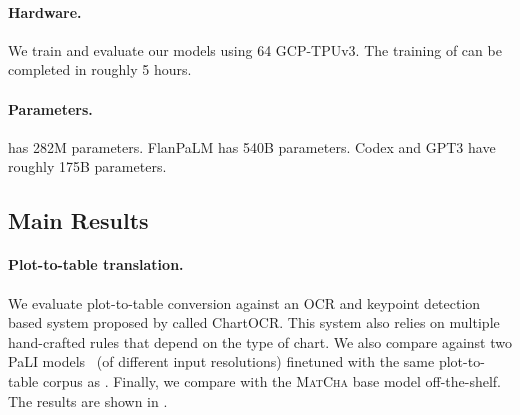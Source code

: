 \begin{table}[ht]
\centering
\caption{Data statistics for the training data of plot-to-table task.}
\label{tab:deplot_stats}
\end{table}


\paragraph{Hardware.} We train and evaluate our models using 64 GCP-TPUv3. The training of \model{} can be completed in roughly 5 hours.

\paragraph{Parameters.} \model{} has 282M parameters. FlanPaLM has 540B parameters. Codex and GPT3 have roughly 175B parameters.




\begin{table}[t!]
    \centering
\caption{Dataset statistics of the test sets for ChartQA and PlotQA.}
\label{tab:stats}
\end{table}


\subsection{Main Results}\label{sec:main_results}

\paragraph{Plot-to-table translation.} We evaluate plot-to-table conversion against an OCR and keypoint detection based system proposed by \citet{luo2021chartocr} called ChartOCR. This system also relies on multiple hand-crafted rules that depend on the type of chart. We also compare against two PaLI models~\cite{chen2022pali} (of different input resolutions) finetuned with the same plot-to-table corpus as \model. Finally, we compare with the \textsc{MatCha} base model off-the-shelf. The results are shown in .


